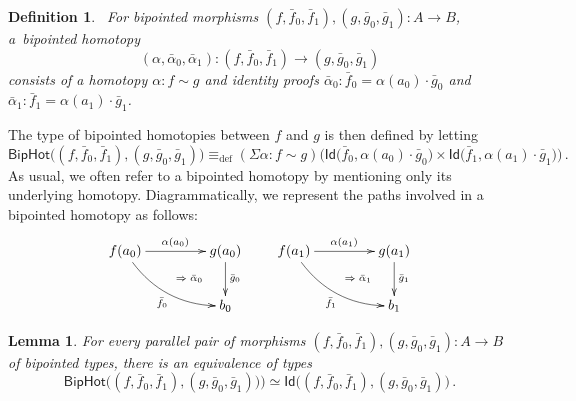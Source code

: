 \documentclass[10pt,a4paper,oneside,reqno]{amsart}
\numberwithin{equation}{section}
\theoremstyle{mythm}
\newtheorem{lemma}[theorem]{Lemma}
\theoremstyle{mydef}
\newtheorem{definition}[theorem]{Definition}
\theoremstyle{myrmk}
\newcommand{\deq}{\equiv}
\newcommand{\defeq}{\deq_{\mathrm{def}}}
\newcommand{\co}{\colon}
\newcommand{\ct}{\cdot}
\newcommand{\Id}{\mathsf{Id}}
\newcommand{\BipHot}{\mathsf{BipHot}}
\begin{document}
\begin{definition}\ \label{thm:biphomotopy} For bipointed morphisms $(f, \bar{f}_0, \bar{f}_1) , (g, \bar{g}_0, \bar{g}_1) \co A \to B$, a~\emph{bipointed homotopy} 
\[
(\alpha, \bar{\alpha}_0, \bar{\alpha}_1) \co (f, \bar{f}_0, \bar{f}_1) \to  (g, \bar{g}_0, \bar{g}_1)
\] 
consists of a homotopy $\alpha \co  f \sim g$ and identity proofs
$\bar{\alpha}_0 \co  \bar{f}_0 = \alpha(a_0)  \cdot \bar{g}_0 $ and $\bar{\alpha}_1 \co \bar{f}_1 =  \alpha(a_1) \cdot \bar{g}_1$. 
\end{definition}

The type of bipointed homotopies between $f$ and $g$ is then defined by letting
\[
 \BipHot  \big( (f,\bar{f}_0, \bar{f}_1), (g, \bar{g}_0, \bar{g}_1) \big)   \defeq   
 (\Sigma \alpha \co f \sim g)  \big( 
  \Id\big( \bar{f}_0 ,  \alpha(a_0)  \ct \bar{g}_0 \big) \times 
  \Id \big( \bar{f}_1,  \alpha(a_1) \ct  \bar{g}_1 \big) \big) \, .
\]
As usual, we often refer to a bipointed homotopy by mentioning only its underlying homotopy.
Diagrammatically, we represent the paths involved in a bipointed homotopy as follows:
\[
\xymatrix@C=1.5cm{
f(a_0) \ar[r]^{\alpha(a_0)}  \ar@/_1pc/[dr]_{\bar{f}_0}  
\ar@{}[dr]|{\qquad \Rightarrow \; \bar{\alpha}_0}  & g(a_0) \ar[d]^{\bar{g}_0}  \\ 
 & b_0 } \qquad
 \xymatrix@C=1.5cm{
f(a_1) \ar[r]^{\alpha(a_1)}  \ar@/_1pc/[dr]_{\bar{f}_1}  
\ar@{}[dr]|{\qquad \Rightarrow \; \bar{\alpha}_1}  & g(a_1) \ar[d]^{\bar{g}_1}  \\ 
 & b_1 }
 \] 



\begin{lemma} \label{BoolHomSpace} 
For every parallel pair of morphisms $(f, \bar{f}_0, \bar{f}_1), (g, \bar{g}_0, \bar{g}_1) \co A \to B$ of bipointed types, there is an equivalence of types
\[
\BipHot\big( (f, \bar{f}_0, \bar{f}_1), (g, \bar{g}_0, \bar{g}_1) ) \big) \simeq 
\Id \big( (f, \bar{f}_0, \bar{f}_1), (g, \bar{g}_0, \bar{g}_1) \big)\, .
\]
\end{lemma}
\end{document}
